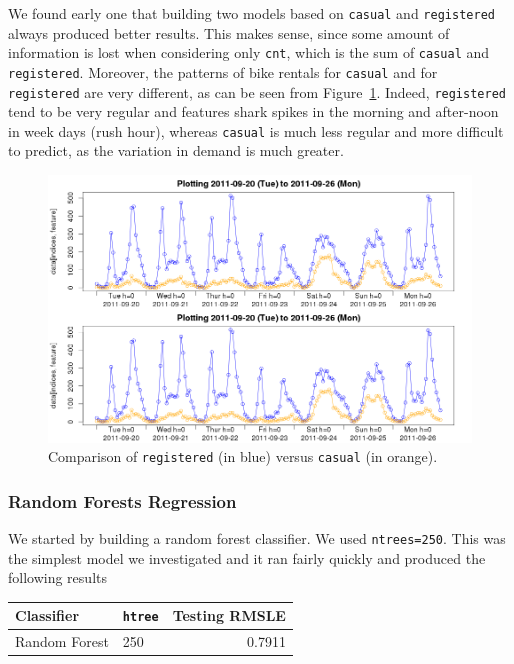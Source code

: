 \documentclass[12pt]{article}
\begin{document}
We found early one that building two models based on \texttt{casual} and \texttt{registered} always produced better results. This makes sense, since some amount of information is lost when considering only \texttt{cnt}, which is the sum of \texttt{casual} and \texttt{registered}. Moreover, the patterns of bike rentals for \texttt{casual} and for \texttt{registered} are very different, as can be seen from Figure~\ref{fig:compare-casual-registered}. Indeed, \texttt{registered} tend to be very regular and features shark spikes in the morning and after-noon in week days (rush hour), whereas \texttt{casual} is much less regular and more difficult to predict, as the variation in demand is much greater.


\begin{figure}[H]
	\centering
	\includegraphics[width=.98\textwidth]{figures/compare-casual-registered.png}
	\caption{Comparison of {\color{blue}\texttt{registered}} (in blue) versus {\color{orange}\texttt{casual}} (in orange).}
	\label{fig:compare-casual-registered}
\end{figure}

\subsubsection{Random Forests Regression}
We started by building a random forest classifier. We used \texttt{ntrees=250}. This was the simplest model we investigated and it ran fairly quickly and produced the following results
	
\begin{table}[H]
\centering
\begin{tabular}{llr}
	Classifier & \texttt{htree} & Testing RMSLE \\
	\hline
	Random Forest & 250 & 0.7911\\
\end{tabular}
\end{table}
\end{document}
